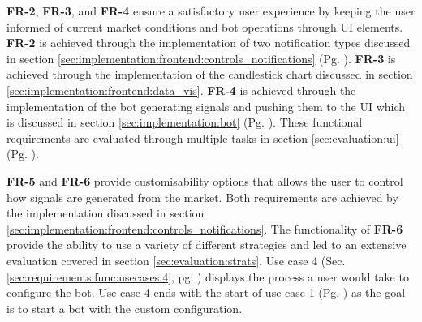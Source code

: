 \textbf{FR-2}, \textbf{FR-3}, and \textbf{FR-4} ensure a satisfactory user experience by keeping the user informed of current market conditions and bot operations through UI elements. \textbf{FR-2} is achieved through the implementation of two notification types discussed in section \ref{sec:implementation:frontend:controls_notifications} (Pg. \pageref{sec:implementation:frontend:controls_notifications}). \textbf{FR-3} is achieved through the implementation of the candlestick chart discussed in section \ref{sec:implementation:frontend:data_vis}. \textbf{FR-4} is achieved through the implementation of the bot generating signals and pushing them to the UI which is discussed in section \ref{sec:implementation:bot} (Pg. \pageref{sec:implementation:bot}). These functional requirements are evaluated through multiple tasks in section \ref{sec:evaluation:ui} (Pg. \pageref{sec:evaluation:ui}).


\textbf{FR-5} and \textbf{FR-6} provide customisability options that allows the user to control how signals are generated from the market. Both requirements are achieved by the implementation discussed in section \ref{sec:implementation:frontend:controls_notifications}. The functionality of \textbf{FR-6} provide the ability to use a variety of different strategies and led to an extensive evaluation covered in section \ref{sec:evaluation:strats}. Use case 4 (Sec. \ref{sec:requirements:func:usecases:4}, pg. \pageref{sec:requirements:func:usecases:4}) displays the process a user would take to configure the bot. Use case 4 ends with the start of use case 1 (Pg. \pageref{sec:requirements:func:usecases:4}) as the goal is to start a bot with the custom configuration. 

